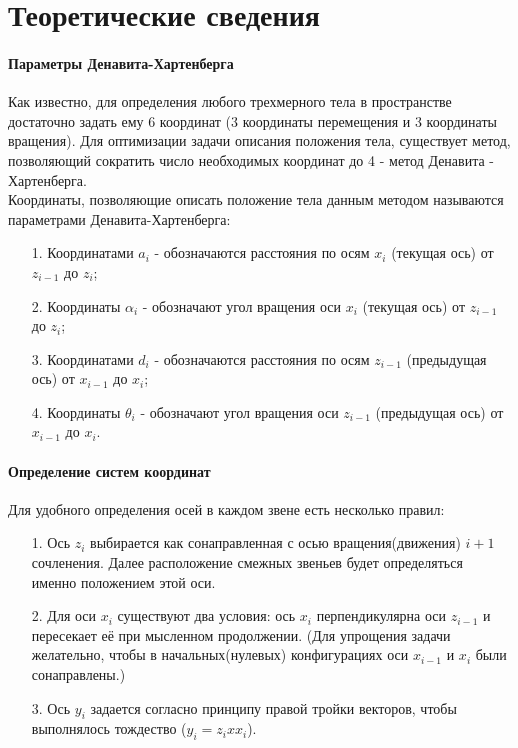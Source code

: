 \documentclass[12pt,a4paper,openany]{extarticle}
\begin{document}
\section{Теоретические сведения\\}

\paragraph*{Параметры Денавита-Хартенберга\\}

\hspace*{\parindent}Как известно, для определения любого трехмерного тела в пространстве достаточно задать ему 6 координат (3 координаты перемещения и 3 координаты вращения). Для оптимизации задачи описания положения тела, существует метод, позволяющий сократить число необходимых координат до 4 - метод Денавита - Хартенберга.\\

\hspace*{\parindent}Координаты, позволяющие описать положение тела данным методом называются параметрами Денавита-Хартенберга:
\begin{enumerate} 
 \item[1.] Координатами $a_i$ - обозначаются расстояния по осям $x_i$ (текущая ось) от  $z_{i-1}$ до $z_i$;
 \item[2.] Координаты $\alpha_i$ - обозначают угол вращения оси $x_i$ (текущая ось) от  $z_{i-1}$ до $z_i$;
 \item[3.] Координатами $d_i$ - обозначаются расстояния по осям $z_{i-1}$ (предыдущая ось) от  $x_{i-1}$ до $x_i$;
 \item[4.] Координаты $\theta_i$ - обозначают угол вращения оси $z_{i-1}$ (предыдущая ось) от  $x_{i-1}$ до $x_i$.\\
 \end{enumerate}
 
 \paragraph*{Определение систем координат\\}
 
\hspace*{\parindent}Для удобного определения осей в каждом звене есть несколько правил:
\begin{enumerate} 
\item[1.] Ось $z_i$ выбирается как сонаправленная с осью вращения(движения) $i+1$ сочленения. Далее расположение смежных звеньев будет определяться именно положением этой оси.
\item[2.] Для оси $x_i$ существуют два условия: ось $x_i$ перпендикулярна оси $z_{i-1}$ и пересекает её при мысленном продолжении. (Для упрощения задачи желательно, чтобы в начальных(нулевых) конфигурациях оси $x_{i-1}$ и $x_i$ были сонаправлены.)
\item[3.] Ось $y_i$ задается согласно принципу правой тройки векторов, чтобы выполнялось тождество ($y_i = z_i x x_i$).
 \end{enumerate}
\end{document}
